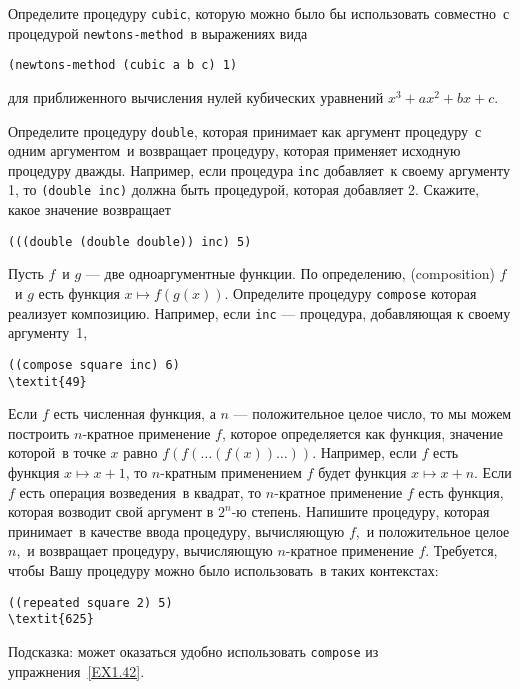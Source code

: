 \begin{exercise}{1.40}\label{EX1.40}%
Определите процедуру {\tt cubic}, которую можно
было бы использовать совместно~с процедурой
{\tt newtons-method}~в выражениях вида

\begin{Verbatim}[fontsize=\small]
(newtons-method (cubic a b c) 1)
\end{Verbatim}
для приближенного вычисления нулей кубических уравнений $x^3 +
ax^2 + bx + c$.
\end{exercise}
\begin{exercise}{1.41}\label{EX1.41}%
Определите процедуру {\tt double}, которая
принимает как аргумент процедуру~с одним аргументом~и возвращает
процедуру, которая применяет исходную процедуру дважды.  Например,
если процедура {\tt inc} добавляет~к своему аргументу 1, то
{\tt (double inc)} должна быть процедурой, которая добавляет
2.  Скажите, какое значение возвращает

\begin{Verbatim}
(((double (double double)) inc) 5)
\end{Verbatim}
\end{exercise}
\begin{exercise}{1.42}\label{EX1.42}%
Пусть $f$~и $g$ --- две
одноаргументные функции.  По определению, 
(com\-po\-si\-tion) 
$f$~и $g$ есть функция 
$x \mapsto f(g(x))$. Определите процедуру {\tt compose}
которая реализует композицию.  Например, если {\tt inc} ---
процедура, добавляющая к своему аргументу~1,

\begin{Verbatim}
((compose square inc) 6)
\textit{49}
\end{Verbatim}

\end{exercise}
\begin{exercise}{1.43}\label{EX1.43}%
Если $f$ есть численная функция, а
$n$ --- положительное целое число, то мы можем построить
$n$-кратное применение $f$, которое
определяется как функция, значение которой~в точке $x$
равно $f(f( \ldots (f(x)) \ldots ))$. Например, если
$f$ есть функция $x \mapsto x + 1$, то
$n$-кратным применением $f$ будет функция
$x \mapsto x + n$.  Если $f$ есть операция
возведения~в квадрат, то $n$-кратное применение
$f$ есть функция, которая возводит свой аргумент в
$2^n$-ю степень.  Напишите процедуру, которая принимает~в 
качестве ввода процедуру, вычисляющую $f$,~и положительное
целое $n$,~и возвращает процедуру, вычисляющую
$n$-кратное применение $f$.  Требуется, чтобы
Вашу процедуру можно было использовать~в таких контекстах:

\begin{Verbatim}
((repeated square 2) 5)
\textit{625}
\end{Verbatim}

Подсказка: может оказаться удобно использовать {\tt compose} из 
упражнения~\ref{EX1.42}.
\end{exercise}

